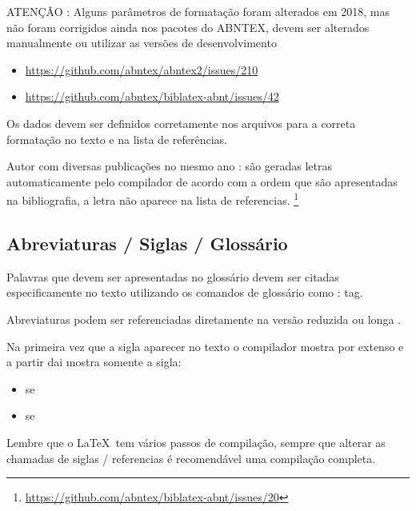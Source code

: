 ATENÇÃO : Alguns parâmetros de formatação foram alterados em 2018, mas não foram corrigidos ainda nos pacotes do ABNTEX, devem ser alterados manualmente ou utilizar as versões de desenvolvimento
\begin{itemize}
    \item \url{https://github.com/abntex/abntex2/issues/210}
    \item \url{https://github.com/abntex/biblatex-abnt/issues/42}
\end{itemize}

Os dados devem ser definidos corretamente nos arquivos  para a correta formatação no texto e na lista de referências.

Autor com diversas publicações no mesmo ano : são geradas letras automaticamente pelo compilador de acordo com a ordem que são apresentadas na bibliografia, a letra não aparece na lista de referencias. \footnote{\url{https://github.com/abntex/biblatex-abnt/issues/20}}


\subsection{Abreviaturas / Siglas / Glossário}

Palavras que devem ser apresentadas no glossário devem ser citadas especificamente no texto utilizando os comandos de glossário como : \gls{tag}.

Abreviaturas podem ser referenciadas diretamente na versão reduzida  \space  
ou longa .

Na primeira vez que a sigla aparecer no texto o compilador mostra por extenso e a partir dai mostra somente a sigla:

\begin{itemize}
    \item \gls{se}
    \item \gls{se}
\end{itemize}

Lembre que o \LaTeX \ tem vários passos de compilação, sempre que alterar as chamadas de siglas / referencias é recomendável uma compilação completa.




